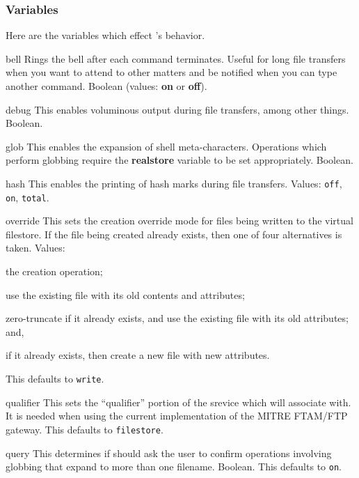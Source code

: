 \subsubsection	{Variables}
Here are the variables which effect 's behavior.
\begin{describe}
\item[bell]
Rings the bell after each command terminates.
Useful for long file transfers when you want to attend to other matters and
be notified when you can type another command.
Boolean (values: {\bf on\/} or {\bf off\/}).

\item[debug]
This enables voluminous output during file transfers,
among other things.  Boolean.

\item[glob]
This enables the expansion of shell meta-characters.
Operations which perform globbing
require the {\bf realstore\/} variable to be set appropriately.
Boolean.

\item[hash]
This enables the printing of hash marks during file transfers.
Values:
\verb"off", \verb"on", \verb"total".

\item[override]
This sets the creation override mode for files being written to the virtual
filestore.
If the file being created already exists,
then one of four alternatives is taken.
Values:
\begin{describe}
\item[\verb"fail":]
the creation operation;
\item[\verb"select":]
use the existing file with its old contents and attributes;
\item[\verb"write":]
zero-truncate if it already exists, and use the existing file with its old
attributes;
and,
\item[\verb"delete":]
if it already exists, then create a new file with new attributes.
\end{describe}
This defaults to \verb"write".

\item[qualifier]
This sets the ``qualifier'' portion of the srevice which  will
associate with.
It is needed when using the current implementation of the MITRE FTAM/FTP
gateway. 
This defaults to \verb"filestore".

\item[query]
This determines if  should ask the user to confirm operations
involving globbing that expand to more than one filename.
Boolean.
This defaults to \verb"on".


\end{describe}
